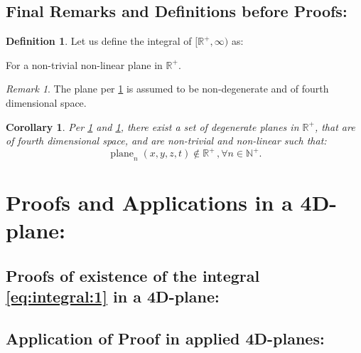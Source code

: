 \documentclass[10pt]{article}
\theoremstyle{plain}
\newtheorem{corollary}[theorem]{Corollary}
\theoremstyle{definition}
\newtheorem{definition}[theorem]{Definition}
\theoremstyle{remark}
\newtheorem{remark}[theorem]{Remark}
\begin{document}
\subsection{Final Remarks and Definitions before Proofs:}

\begin{definition}
\label{def:plane-1}
Let us define the integral of $[\mathbb{R}^{+}, \infty)$ as:
\begin{center}
\end{center}
For a non-trivial non-linear plane in $\mathbb{R}^{+}$.
\end{definition}
\begin{remark}
\label{rem:plane-1}
The plane per \ref{def:plane-1} is assumed to be non-degenerate and of fourth dimensional space.
\end{remark}

\begin{corollary}
Per \ref{def:plane-1} and \ref{rem:plane-1}, there exist a set of degenerate planes in $\mathbb{R}^{+}$, that are of fourth dimensional space, and are non-trivial and non-linear such that:
\begin{equation}
  \operatorname{plane}_{n}(x, y, z, t) \notin \mathbb{R}^{+}\, , \forall n \in \mathbb{N}^{+}.
\end{equation}
\end{corollary}

\section{Proofs and Applications in a 4D-plane:}

\subsection{Proofs of existence of the integral \ref{eq:integral:1} in a 4D-plane:}

\subsection{Application of Proof in applied 4D-planes:}
\end{document}
